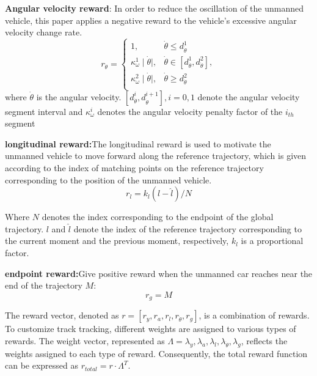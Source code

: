 \documentclass[sn-mathphys]{sn-jnl}%
\theoremstyle{thmstyleone}%
\theoremstyle{thmstyletwo}%
\theoremstyle{thmstylethree}%
\begin{document}
\textbf{Angular velocity reward}: In order to reduce the oscillation of the unmanned vehicle, this paper applies a negative reward to the vehicle's excessive angular velocity change rate.
 \begin{equation}
r_{\dot{\theta}}=\begin{cases}
1 , &\dot{\theta} \leq d_{\dot{\theta}}^1\\
\kappa_\omega^1 \mid \dot{\theta} \mid , &\dot{\theta} \in \left[d_{\dot{\theta}}^1,d_{\dot{\theta}}^2 \right],\\
\kappa_\omega^2 \mid \dot{\theta} \mid , &\dot{\theta} \geq d_{\dot{\theta}}^2 \\

\end{cases}
\end{equation}
where $\dot{\theta} $ is the angular velocity. $\left[d_{\dot{\theta}}^i,d_{\dot{\theta}}^{i+1}\right], i=0,1 $ denote the angular velocity segment interval and  $\kappa_\omega^i$ denotes the angular velocity penalty factor of the $  i_{th} $ segment

\textbf{longitudinal reward:}The longitudinal reward is used to motivate the unmanned vehicle to move forward along the reference trajectory, which is given according to the index of matching points on the reference trajectory corresponding to the position of the unmanned vehicle.
\begin{equation}
r_l=k_l(l-\widehat{l})/N
\end{equation}

Where $N$ denotes the index corresponding to the endpoint of the global trajectory. $l$ and $\widehat{l} $ denote the index of the reference trajectory corresponding to the current moment and the previous moment, respectively, $ k_l $ is a proportional factor.

\textbf{endpoint reward:}Give positive reward when the unmanned car reaches near the end of the trajectory $ M $:
\begin{equation}
r_g=M
\end{equation}

The reward vector, denoted as $r = [r_y,r_a,r_l,r_{\dot{\theta}},r_g]$,  is a combination of rewards. To customize track tracking, different weights are assigned to various types of rewards. The weight vector, represented as $\Lambda={\lambda_y, \lambda_a, \lambda_l, \lambda_{\dot{\theta}}, \lambda_g}$, reflects the weights assigned to each type of reward. Consequently, the total reward function can be expressed as $r_{total}=r \cdot \Lambda^T$.
\end{document}
